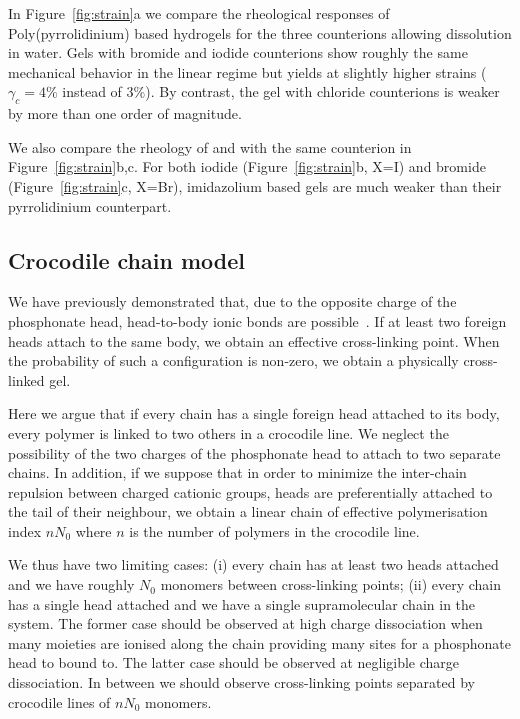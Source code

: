 \documentclass[journal=jacsat,manuscript=article]{achemso}
\begin{document}
In Figure~\ref{fig:strain}a we compare the rheological responses of Poly(pyrrolidinium) based hydrogels for the three counterions allowing dissolution in water. Gels with bromide and iodide counterions show roughly the same mechanical behavior in the linear regime but  yields at slightly higher strains ($\gamma_c=4\%$ instead of $3\%$). By contrast, the gel with chloride counterions is weaker by more than one order of magnitude.

We also compare the rheology of  and  with the same counterion  in Figure~\ref{fig:strain}b,c. For both iodide (Figure~\ref{fig:strain}b, X=I) and bromide (Figure~\ref{fig:strain}c, X=Br), imidazolium based gels are much weaker than their pyrrolidinium counterpart.



\subsection{Crocodile chain model}
We have previously demonstrated that, due to the opposite charge of the phosphonate head, head-to-body ionic bonds are possible~\cite{Srour2014}. If at least two foreign heads attach to the same body, we obtain an effective cross-linking point. When the probability of such a configuration is non-zero, we obtain a physically cross-linked gel.

Here we argue that if every chain has a single foreign head attached to its body, every polymer is linked to two others in a crocodile line. We neglect the possibility of the two charges of the phosphonate head to attach to two separate chains. In addition, if we suppose that in order to minimize the inter-chain repulsion between charged cationic groups, heads are preferentially attached to the tail of their neighbour, we obtain a linear chain of effective polymerisation index $n N_0$ where $n$ is the number of polymers in the crocodile line.

We thus have two limiting cases: (i) every chain has at least two heads attached and we have roughly $N_0$ monomers between cross-linking points; (ii) every chain has a single head attached and we have a single supramolecular chain in the system. The former case should be observed at high charge dissociation when many moieties are ionised along the chain providing many sites for a phosphonate head to bound to. The latter case should be observed at negligible charge dissociation. In between we should observe cross-linking points separated by crocodile lines of $n N_0$ monomers.
\end{document}
